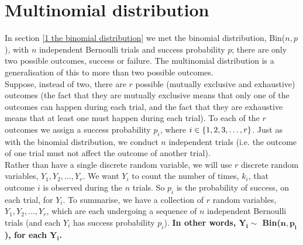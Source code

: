 \section{Multinomial distribution} \label{multinomial distribution} \label{multinomial coefficients}
In section \ref{1 the binomial distribution} we met the binomial distribution, Bin($n,p$), with $n$ independent Bernoulli trials and success probability $p$; there are only two possible outcomes, success or failure. The multinomial distribution is a generalisation of this to more than two possible outcomes. \\

\noindent Suppose, instead of two, there are $r$ possible (mutually exclusive and exhaustive) outcomes (the fact that they are mutually exclusive means that only one of the outcomes can happen during each trial, and the fact that they are exhaustive means that at least one must happen during each trial). To each of the $r$ outcomes we assign a success probability $p_i$, where $i \in \left\{1,2,3,\ldots,r\right\}$. Just as with the binomial distribution, we conduct $n$ independent trials (i.e. the outcome of one trial must not affect the outcome of another trial). \\

\noindent Rather than have a single discrete random variable, we will use $r$ discrete random variables, $Y_1, Y_2, \ldots, Y_r$. We want $Y_i$ to count the number of times, $k_i$, that outcome $i$ is observed during the $n$ trials. So $p_i$ is the probability of success, on each trial, for $Y_i$. To summarise, we have a collection of $r$ random variables, $Y_1,Y_2,\ldots,Y_r$, which are each undergoing a sequence of $n$ independent Bernoulli trials (and each $Y_i$ has success probability $p_i$). \textbf{In other words, $\boldsymbol{Y_i \sim}$ Bin($\boldsymbol{n,p_i}$), for each $\boldsymbol{Y_i}$.} \\

